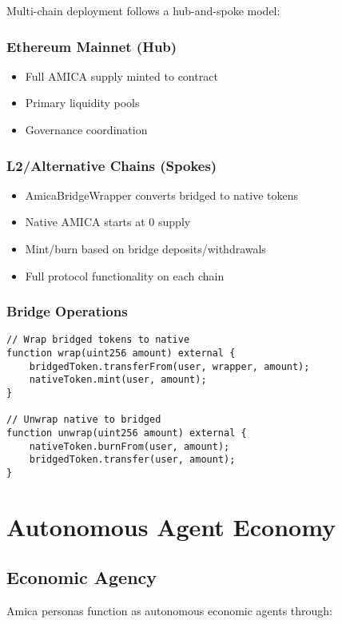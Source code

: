\documentclass{article}
\begin{document}
Multi-chain deployment follows a hub-and-spoke model:

\subsubsection{Ethereum Mainnet (Hub)}
\begin{itemize}
    \item Full AMICA supply minted to contract
    \item Primary liquidity pools
    \item Governance coordination
\end{itemize}

\subsubsection{L2/Alternative Chains (Spokes)}
\begin{itemize}
    \item AmicaBridgeWrapper converts bridged to native tokens
    \item Native AMICA starts at 0 supply
    \item Mint/burn based on bridge deposits/withdrawals
    \item Full protocol functionality on each chain
\end{itemize}

\subsubsection{Bridge Operations}
\begin{verbatim}
// Wrap bridged tokens to native
function wrap(uint256 amount) external {
    bridgedToken.transferFrom(user, wrapper, amount);
    nativeToken.mint(user, amount);
}

// Unwrap native to bridged
function unwrap(uint256 amount) external {
    nativeToken.burnFrom(user, amount);
    bridgedToken.transfer(user, amount);
}
\end{verbatim}

\section{Autonomous Agent Economy}

\subsection{Economic Agency}

Amica personas function as autonomous economic agents through:
\end{document}
